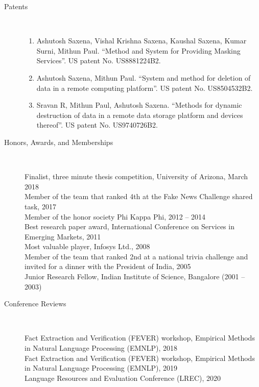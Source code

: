 \documentclass[10pt]{article}
\newcommand{\ti}[1]{``#1''} %
\begin{document}
\begin{description}
\item [Patents] \
\begin{enumerate}


\item 
Ashutosh Saxena, Vishal Krishna Saxena, Kaushal Saxena, Kumar Surni, Mithun Paul. \ti{Method and System for Providing Masking Services}.  US patent No. US8881224B2.
\item 
Ashutosh Saxena, Mithun Paul. \ti{System and method for deletion of data in a remote computing platform}.  US patent No. US8504532B2.
\item 
Sravan R, Mithun Paul, Ashutosh Saxena. \ti{Methods for dynamic destruction of data in a remote data storage platform and devices thereof}.  US patent No. US9740726B2.


\end{enumerate}

\vspace{-.3cm}
\item [Honors, Awards, and Memberships]\

Finalist, three minute thesis competition, University of Arizona, March 2018\\
Member of the team that ranked 4th at the Fake News Challenge shared task, 2017\\
Member of the honor society Phi Kappa Phi, 2012 -- 2014\\
Best research paper award, International Conference on Services in Emerging Markets, 2011\\
Most valuable player,  Infosys  Ltd., 2008\\
Member of the team that ranked 2nd at a national trivia challenge and invited for a dinner with the President of India, 2005\\
Junior Research Fellow, Indian Institute of Science, Bangalore (2001 – 2003)\\




\vspace{-.4cm}\item [Conference Reviews]\ 

Fact Extraction and Verification (FEVER) workshop, Empirical Methods in Natural Language Processing (EMNLP), 2018\\
Fact Extraction and Verification (FEVER) workshop, Empirical Methods in Natural Language Processing (EMNLP), 2019\\
Language Resources and Evaluation Conference (LREC), 2020\\






\end{description}
\end{document}

